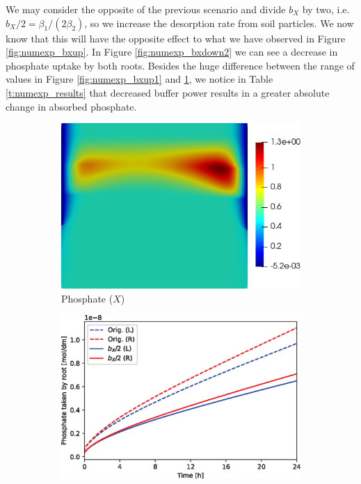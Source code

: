 \documentclass[11pt]{article}
\numberwithin{equation}{section}
\begin{document}
We may consider the opposite of the previous scenario and divide $b_X$ by two, i.e. $b_X / 2 = \beta_1 / (2 \beta_2)$, so we increase the desorption rate from soil particles. We now know that this will have the opposite effect to what we have observed in Figure \ref{fig:numexp_bxup}. In Figure \ref{fig:numexp_bxdown2} we can see a decrease in phosphate uptake by both roots. Besides the huge difference between the range of values in Figure \ref{fig:numexp_bxup1} and \ref{fig:numexp_bxdown1}, we notice in Table \ref{t:numexp_results} that decreased buffer power results in a greater absolute change in absorbed phosphate.

\begin{figure}[!htb]
\centering
\begin{subfigure}[t]{0.35\textwidth}
    \includegraphics[width=\textwidth]{Figures/X_bXdivby2.png}
    \caption{Phosphate ($X$)}
    \label{fig:numexp_bxdown1}
\end{subfigure}
\hspace{1cm}
\begin{subfigure}[t]{0.4\textwidth}
    \includegraphics[width=\textwidth]{Figures/bxdivby2.eps}

\end{subfigure}
\end{figure}
\end{document}
